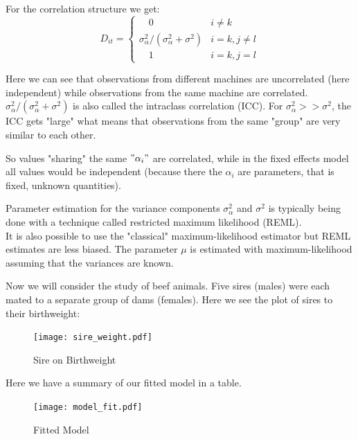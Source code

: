 \documentclass[unknownkeysallowed]{beamer}
\begin{document}
\begin{frame}
	For the correlation structure we get:
	\begin{equation*}
	D_{it} =
	\begin{cases}
	\quad 0 & i \neq k\\
	\sigma^2_{\alpha}/(\sigma^2_{\alpha} + \sigma^2) & i = k, j\neq l\\
	\quad 1 & i=k, j=l
	\end{cases}
	\end{equation*}
	
	Here we can see that observations from different machines are uncorrelated (here independent) while observations from the same machine are correlated. \\
	$\sigma^2_{\alpha}/(\sigma^2_{\alpha} + \sigma^2)$ is also called the intraclass correlation (ICC). For $\sigma^2_{\alpha} >> \sigma^2$, the ICC gets "large" what means that observations from the same "group" are very similar to each other.
	
	So values "sharing" the same $"\alpha_i "$ are correlated, while in the fixed effects model all values would be independent (because there the $\alpha_i$ are parameters, that is fixed, unknown quantities).
\end{frame}

\begin{frame}
	Parameter estimation for the variance components $\sigma^2_{\alpha}$ and $\sigma^2$ is typically being done with a technique called restricted maximum likelihood (REML).\\
	It is also possible to use the "classical" maximum-likelihood estimator but REML estimates are less biased. The parameter $\mu$ is estimated with maximum-likelihood assuming that the variances are known. 
\end{frame}

\begin{frame}
	Now we will consider the study of beef animals. Five sires (males) were each mated to a separate group of dams (females). Here we see the plot of sires to their birthweight:
	\begin{figure}
			\centering
			\texttt{[image: sire\_weight.pdf]}
			\caption{Sire on Birthweight}
			\label{fig:my_label}
	\end{figure}
		
	
\end{frame}


\begin{frame}
	Here we have a summary of our fitted model in a table.
	
	\begin{figure}
		\centering
		\texttt{[image: model\_fit.pdf]}
		\caption{Fitted Model}
		\label{fig:my_label}
	\end{figure}

\end{frame}
\end{document}
